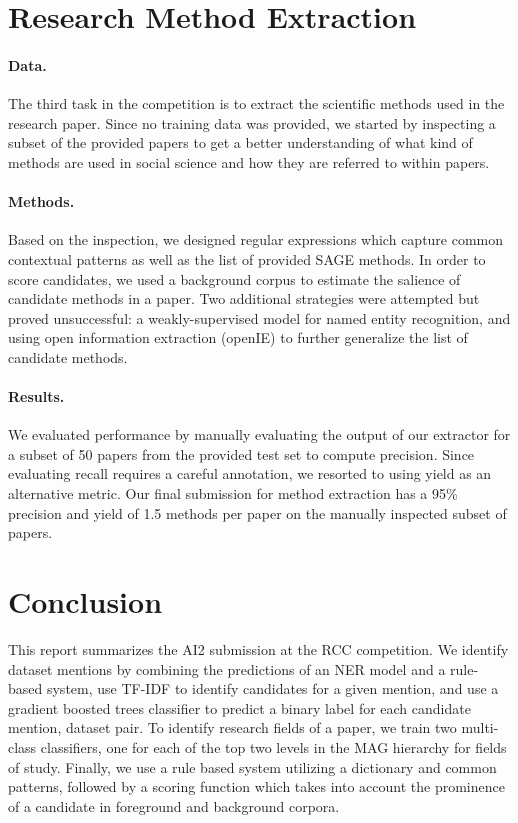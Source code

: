 \documentclass[11pt]{article}
\begin{document}
\section{Research Method Extraction}
\label{sec:methods}
\paragraph{Data.}
The third task in the competition is to extract the scientific methods used in the research paper.
Since no training data was provided, we started by inspecting a subset of the provided papers to get a better understanding of what kind of methods are used in social science and how they are referred to within papers. 

\paragraph{Methods.}
Based on the inspection, we designed regular expressions which capture common contextual patterns as well as the list of provided SAGE methods. 
In order to score candidates, we used a background corpus to estimate the salience of candidate methods in a paper.
Two additional strategies were attempted but proved unsuccessful: a weakly-supervised model for named entity recognition, and using open information extraction (openIE) to further generalize the list of candidate methods.

\paragraph{Results.}
We evaluated performance by manually evaluating the output of our extractor for a subset of 50 papers from the provided test set to compute precision. 
Since evaluating recall requires a careful annotation, we resorted to using yield as an alternative metric.
Our final submission for method extraction has a 95\% precision and yield of 1.5 methods per paper on the manually inspected subset of papers.

\section{Conclusion}
This report summarizes the AI2 submission at the RCC competition.
We identify dataset mentions by combining the predictions of an NER model and a rule-based system, use TF-IDF to identify candidates for a given mention, and use a gradient boosted trees classifier to predict a binary label for each candidate mention, dataset pair.
To identify research fields of a paper, we train two multi-class classifiers, one for each of the top two levels in the MAG hierarchy for fields of study.
Finally, we use a rule based system utilizing a dictionary and common patterns, followed by a scoring function which takes into account the prominence of a candidate in foreground and background corpora.
\end{document}
